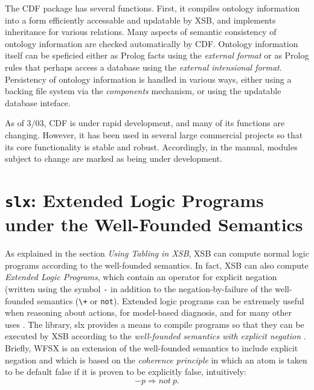{The CDF package has several functions.  First, it compiles ontology
information into a form efficiently accessable and updatable by XSB,
and implements inheritance for various relations.  Many aspects of
semantic consistency of ontology information are checked automatically
by CDF.  Ontology information itself can be speficied either as Prolog
facts using the {\em external format} or as Prolog rules that perhaps
access a database using the {\em external intensional format}.
Persistency of ontology information is handled in various ways, either
using a backing file system via the {\em components} mechanism, or
using the updatable database inteface.

As of 3/03, CDF is under rapid development, and many of its functions
are changing.  However, it has been used in several large commercial
projects so that its core functionality is stable and robust.
Accordingly, in the manual, modules subject to change are marked as
being under development.
}

\section{{\tt slx}: Extended Logic Programs under the Well-Founded
Semantics}
\label{package:wfsx} 

As explained in the section {\it Using Tabling in XSB}, XSB can
compute normal logic programs according to the well-founded semantics.
In fact, XSB can also compute {\em Extended Logic Programs}, which
contain an operator for explicit negation (written using the symbol
{\tt -} in addition to the negation-by-failure of the well-founded
semantics (\verb|\+| or {\tt not}).  Extended logic programs can be
extremely useful when reasoning about actions, for model-based
diagnosis, and for many other uses \cite{AlPe95}.  The library, {\sf
slx} provides a means to compile programs so that they can be executed
by XSB according to the {\em well-founded semantics with explicit
negation} \cite{ADP95}.  Briefly, WFSX is an extension of the
well-founded semantics to include explicit negation and which is based
on the {\em coherence principle} in which an atom is taken to be
default false if it is proven to be explicitly false, intuitively:
\[
-p \Rightarrow not\ p.
\]

